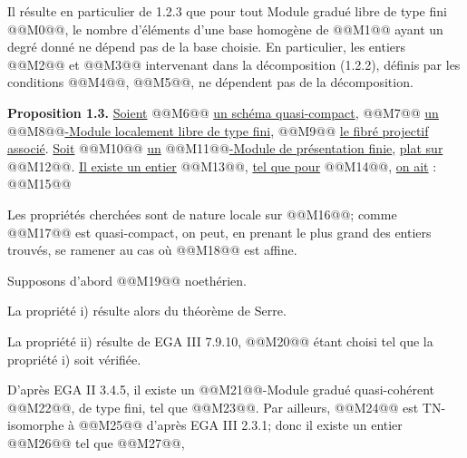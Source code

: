 
Il
résulte en particulier de 1.2.3 que pour tout Module gradué libre de type fini @@M0@@, le nombre d'éléments d'une base homogène de @@M1@@ ayant un degré donné ne dépend pas de la base choisie. En particulier, les entiers @@M2@@ et @@M3@@ intervenant dans la décomposition (1.2.2), définis par les conditions @@M4@@, @@M5@@, ne dépendent pas de la décomposition.

\textbf{Proposition 1.3.} \uline{Soient} @@M6@@ \uline{un schéma quasi-compact}, @@M7@@ \uline{un} @@M8@@\uline{-Module localement libre de type fini}, @@M9@@ \uline{le fibré projectif associé}. \uline{Soit} @@M10@@ \uline{un} @@M11@@\uline{-Module de présentation finie}, \uline{plat sur} @@M12@@. \uline{Il existe un entier} @@M13@@, \uline{tel que pour} @@M14@@, \uline{on ait} :
@@M15@@

Les propriétés cherchées sont de nature locale sur @@M16@@; comme @@M17@@ est quasi-compact, on peut, en prenant le plus grand des entiers trouvés, se ramener au cas où @@M18@@ est affine.

Supposons d'abord @@M19@@ noethérien.

La propriété i) résulte alors du théorème de Serre.

La propriété ii) résulte de EGA III 7.9.10, @@M20@@ étant choisi tel que la propriété i) soit vérifiée.

D'après EGA II 3.4.5, il existe un @@M21@@-Module gradué quasi-cohérent @@M22@@, de type fini, tel que @@M23@@. Par ailleurs, @@M24@@ est TN-isomorphe à @@M25@@ d'après EGA III 2.3.1; donc il existe un entier @@M26@@ tel que @@M27@@,
